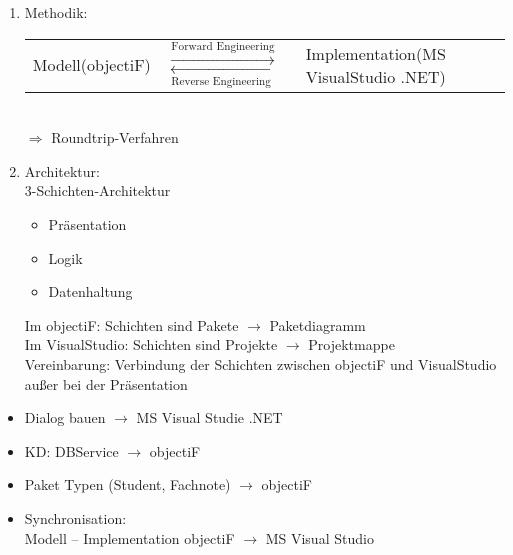 \begin{enumerate}
\item Methodik:\\
\begin{tabular}{L{.3} L{.3} L{0.3}}
Modell\newline (objectiF) & $\overset{\text{Forward Engineering}}{\longrightarrow}$ \newline $\underset{\text{Reverse Engineering}}{\longleftarrow}$ & Implementation\newline (MS VisualStudio .NET)
\end{tabular}\\
$\Rightarrow$ Roundtrip-Verfahren
\item Architektur:\\
3-Schichten-Architektur
\begin{itemize}
\item Präsentation
\item Logik
\item Datenhaltung
\end{itemize}
Im objectiF: Schichten sind Pakete $\to$ Paketdiagramm\\
Im VisualStudio: Schichten sind Projekte $\to$ Projektmappe\\
Vereinbarung: Verbindung der Schichten zwischen objectiF und VisualStudio außer bei der Präsentation
\end{enumerate}

\begin{itemize}
\item Dialog bauen $\to$ MS Visual Studie .NET
\item KD: DBService $\to$ objectiF
\item Paket Typen (Student, Fachnote) $\to$ objectiF
\item Synchronisation:\\
Modell -- Implementation
objectiF $\to$ MS Visual Studio
\end{itemize}












